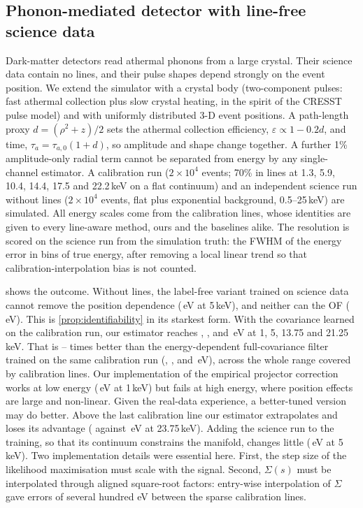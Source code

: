 \documentclass[aps,prapplied,reprint,superscriptaddress,longbibliography,nofootinbib]{revtex4-2}
\theoremstyle{remark}
\begin{document}
\subsection{Phonon-mediated detector with line-free science data}
\label{sec:phonon}
Dark-matter detectors read athermal phonons from a large crystal. Their science
data contain no lines, and their pulse shapes depend strongly on the event
position. We extend the simulator with a crystal body (two-component pulses: fast
athermal collection plus slow crystal heating, in the spirit of the CRESST pulse
model) and with uniformly distributed 3-D event positions. A path-length proxy
$d=(\rho^2+z)/2$ sets the athermal collection efficiency, $\varepsilon\propto1-0.2d$,
and time, $\tau_a=\tau_{a,0}(1+d)$, so amplitude and shape change together. A
further 1\% amplitude-only radial term cannot be separated from energy by any
single-channel estimator. A calibration run ($2\times10^4$ events; 70\% in lines at
1.3, 5.9, 10.4, 14.4, 17.5 and 22.2\,keV on a flat continuum) and an independent
science run without lines ($2\times10^4$ events, flat plus exponential background,
0.5--25\,keV) are simulated. All energy scales come from the calibration lines,
whose identities are given to every line-aware method, ours and the baselines
alike. The resolution is scored on the science run from the simulation truth: the
FWHM of the energy error in bins of true energy, after removing a local linear
trend so that calibration-interpolation bias is not counted.

 shows the outcome. Without lines, the label-free variant trained
on science data cannot remove the position dependence (\phFreeB\,eV at 5\,keV), and
neither can the OF (\phOFB\,eV). This is \cref{prop:identifiability} in its starkest
form. With the covariance learned on the calibration run, our estimator reaches
\phCalA, \phCalB, \phCalC{} and \phCalD\,eV at 1, 5, 13.75 and 21.25\,keV. That is
\phGainCovMin--\phGainCovMax{} times better than the energy-dependent full-covariance
filter trained on the same calibration run (\phCovA, \phCovB, \phCovC{} and
\phCovD\,eV), across the whole range covered by calibration lines. Our implementation of the
empirical projector correction works at low energy (\phProjA\,eV at 1\,keV) but fails
at high energy, where position effects are large and non-linear. Given the
real-data experience, a better-tuned version may do better. Above the last
calibration line our estimator extrapolates and loses its advantage (\phCalE{}
against \phCovE\,eV at 23.75\,keV). Adding the science run to the training, so
that its continuum constrains the manifold, changes little (\phBothB\,eV at
5\,keV). Two implementation details were essential here. First, the step size of
the likelihood maximisation must scale with the signal. Second, $\Sigma(s)$ must be
interpolated through aligned square-root factors: entry-wise interpolation of
$\Sigma$ gave errors of several hundred eV between the sparse calibration lines.
\end{document}
